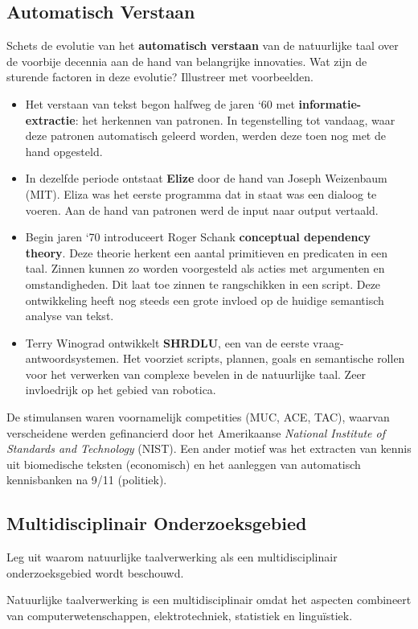 \documentclass[../main.tex]{subfiles}
\begin{document}
\subsection{Automatisch Verstaan}
\begin{question}
Schets de evolutie van het \textbf{automatisch verstaan} van de natuurlijke taal over de voorbije decennia aan de hand van belangrijke innovaties.
Wat zijn de sturende factoren in deze evolutie?
Illustreer met voorbeelden.
\end{question}

\begin{solution}
\begin{itemize}
	\item Het verstaan van tekst begon halfweg de jaren `60 met \textbf{informatie-extractie}: het herkennen van patronen. In tegenstelling tot vandaag, waar deze patronen automatisch geleerd worden, werden deze toen nog met de hand opgesteld.
	\item In dezelfde periode ontstaat \textbf{Elize} door de hand van Joseph Weizenbaum (MIT). Eliza was het eerste  programma dat in staat was een dialoog te voeren. Aan de hand van patronen werd de input naar output vertaald.
	\item Begin jaren `70 introduceert Roger Schank \textbf{conceptual dependency theory}. Deze theorie herkent een aantal primitieven en predicaten in een taal. Zinnen kunnen zo worden voorgesteld als acties met argumenten en omstandigheden. Dit laat toe zinnen te rangschikken in een script. Deze ontwikkeling heeft nog steeds een grote invloed op de huidige semantisch analyse van tekst.
	\item Terry Winograd ontwikkelt \textbf{SHRDLU}, een van de eerste vraag-antwoordsystemen. Het voorziet scripts, plannen, goals en semantische rollen voor het verwerken van complexe bevelen in de natuurlijke taal. Zeer invloedrijk op het gebied van robotica.
\end{itemize}
De stimulansen waren voornamelijk competities (MUC, ACE, TAC), waarvan verscheidene werden gefinancierd door het Amerikaanse \emph{National Institute of Standards and Technology} (NIST). Een ander motief was het extracten van kennis uit biomedische teksten (economisch) en het aanleggen van automatisch kennisbanken na 9/11 (politiek).
\end{solution}

\subsection{Multidisciplinair Onderzoeksgebied}
\begin{question}
Leg uit waarom natuurlijke taalverwerking als een multidisciplinair onderzoeksgebied wordt beschouwd.
\end{question}
\begin{solution}
Natuurlijke taalverwerking is een multidisciplinair omdat het aspecten combineert van computerwetenschappen, elektrotechniek, statistiek en lingu\"istiek.
\end{solution}
\end{document}
